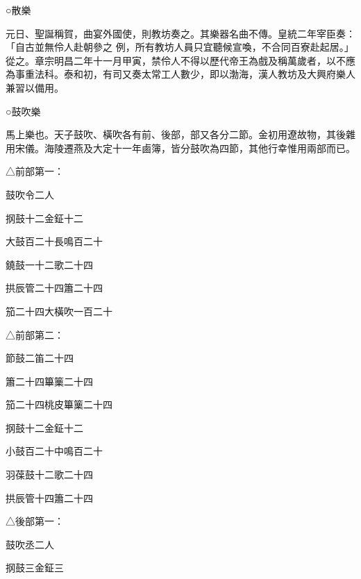 \begin{pinyinscope}
 ○散樂



 元日、聖誕稱賀，曲宴外國使，則教坊奏之。其樂器名曲不傳。皇統二年宰臣奏：「自古並無伶人赴朝參之
 例，所有教坊人員只宜聽候宣喚，不合同百寮赴起居。」從之。章宗明昌二年十一月甲寅，禁伶人不得以歷代帝王為戲及稱萬歲者，以不應為事重法科。泰和初，有司又奏太常工人數少，即以渤海，漢人教坊及大興府樂人兼習以備用。



 ○鼓吹樂



 馬上樂也。天子鼓吹、橫吹各有前、後部，部又各分二節。金初用遼故物，其後雜用宋儀。海陵遷燕及大定十一年鹵簿，皆分鼓吹為四節，其他行幸惟用兩部而已。



 △前部第一：



 鼓吹令二人



 㧏鼓十二金鉦十二



 大鼓百二十長鳴百二十



 鐃鼓一十二歌二十四



 拱辰管二十四簫二十四



 笳二十四大橫吹一百二十



 △前部第二：



 節鼓二笛二十四



 簫二十四篳篥二十四



 笳二十四桃皮篳篥二十四



 㧏鼓十二金鉦十二



 小鼓百二十中鳴百二十



 羽葆鼓十二歌二十四



 拱辰管十四簫二十四



 △後部第一：



 鼓吹丞二人



 㧏鼓三金鉦三




\end{pinyinscope}
